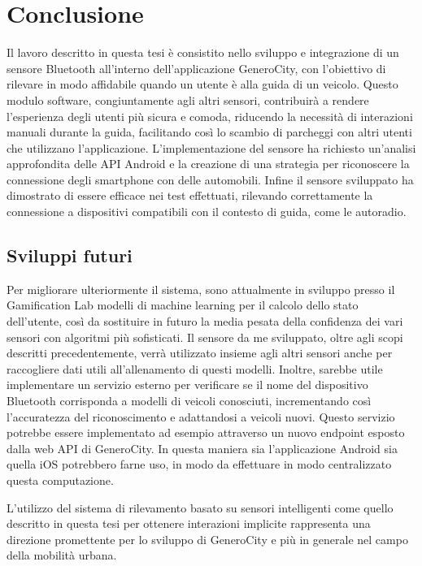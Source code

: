 \chapter{Conclusione}
Il lavoro descritto in questa tesi è consistito nello sviluppo e integrazione di un sensore Bluetooth all'interno dell'applicazione GeneroCity, con l'obiettivo di rilevare in modo affidabile quando un utente è alla guida di un veicolo. Questo modulo software, congiuntamente agli altri sensori, contribuirà a rendere l'esperienza degli utenti più sicura e comoda, riducendo la necessità di interazioni manuali durante la guida, facilitando così lo scambio di parcheggi con altri utenti che utilizzano l'applicazione. L'implementazione del sensore ha richiesto un'analisi approfondita delle API Android e la creazione di una strategia per riconoscere la connessione degli smartphone con delle automobili. Infine il sensore sviluppato ha dimostrato di essere efficace nei test effettuati, rilevando correttamente la connessione a dispositivi compatibili con il contesto di guida, come le autoradio.


\section{Sviluppi futuri}
Per migliorare ulteriormente il sistema, sono attualmente in sviluppo presso il Gamification Lab modelli di machine learning per il calcolo dello stato dell'utente, così da sostituire in futuro la media pesata della confidenza dei vari sensori con algoritmi più sofisticati. Il sensore da me sviluppato, oltre agli scopi descritti precedentemente, verrà utilizzato insieme agli altri sensori anche per raccogliere dati utili all'allenamento di questi modelli. Inoltre, sarebbe utile implementare un servizio esterno per verificare se il nome del dispositivo Bluetooth corrisponda a modelli di veicoli conosciuti, incrementando così l'accuratezza del riconoscimento e adattandosi a veicoli nuovi. Questo servizio potrebbe essere implementato ad esempio attraverso un nuovo endpoint esposto dalla web API di GeneroCity. In questa maniera sia l'applicazione Android sia quella iOS potrebbero farne uso, in modo da effettuare in modo centralizzato questa computazione.

L'utilizzo del sistema di rilevamento basato su sensori intelligenti come quello descritto in questa tesi per ottenere interazioni implicite rappresenta una direzione promettente per lo sviluppo di GeneroCity e più in generale nel campo della mobilità urbana.

